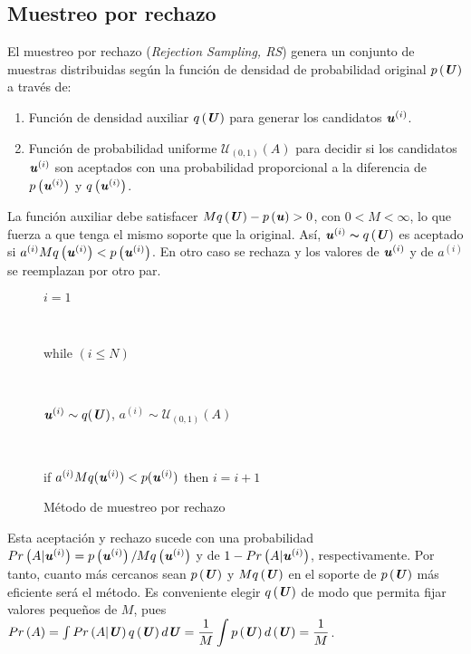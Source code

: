 \subsection{Muestreo por rechazo}
El muestreo por rechazo (\textit{Rejection Sampling, RS}) genera un conjunto de muestras distribuidas según la función de densidad de probabilidad original $p\left(\textbf{\textit{U}}\right)$ a través de:
\begin{enumerate}
    \item Función de densidad auxiliar $q\left(\textbf{\textit{U}}\right)$ para generar los candidatos $\textbf{\textit{u}}^{(i)}$.
    \item Función de probabilidad uniforme $\mathcal{U}_{(0,1)}\left(A\right)$ para decidir si los candidatos $\textbf{\textit{u}}^{(i)}$ son aceptados con una probabilidad proporcional a la diferencia de $p\left(\textbf{\textit{u}}^{(i)}\right)$ y $q\left(\textbf{\textit{u}}^{(i)}\right)$.
\end{enumerate}

La función auxiliar debe satisfacer $Mq\left(\textbf{\textit{U}}\right) - p\left(\textbf{\textit{u}}\right) > 0$, con $0 < M < \infty$, lo que fuerza a que tenga el mismo soporte que la original. Así, $\textbf{\textit{u}}^{(i)} \thicksim q\left(\textbf{\textit{U}}\right)$ es aceptado si $a^{(i)}Mq\left(\textbf{\textit{u}}^{(i)}\right) < p\left(\textbf{\textit{u}}^{(i)}\right)$. En otro caso se rechaza y los valores de $\textbf{\textit{u}}^{(i)}$ y de $a^{(i)}$ se reemplazan por otro par.

\begin{figure}[ht]
    \centering
    \begin{tcolorbox}[colframe=black, colback=white, boxrule=0.5pt, width=0.52\textwidth, sharp corners]
        \parbox[t]{\linewidth}{$i=1$} \\[0.5em]
        \parbox[t]{\linewidth}{while $(i \leq N)$} \\[0.5em]
        \parbox[t]{\linewidth}{\hspace{1em} $\textbf{\textit{u}}^{(i)} \sim q(\textbf{\textit{U}})$, \quad $a^{(i)} \sim \mathcal{U}_{(0,1)}\left(A\right)$} \\[0.5em]
        \parbox[t]{\linewidth}{\hspace{1em} if $a^{(i)}Mq(\textbf{\textit{u}}^{(i)})< p(\textbf{\textit{u}}^{(i)})$ then $i = i + 1$}
    \end{tcolorbox}
    \caption{Método de muestreo por rechazo}
    \label{fig:3.1}
\end{figure}

Esta aceptación y rechazo sucede con una probabilidad $Pr\left(A|\textbf{\textit{u}}^{(i)}\right) = p\left(\textbf{\textit{u}}^{(i)}\right) / Mq\left(\textbf{\textit{u}}^{(i)}\right)$ y de $1-Pr\left(A|\textbf{\textit{u}}^{(i)}\right)$, respectivamente. Por tanto, cuanto más cercanos sean $p\left(\textbf{\textit{U}}\right)$ y $Mq\left(\textbf{\textit{U}}\right)$ en el soporte de $p\left(\textbf{\textit{U}}\right)$ más eficiente será el método. Es conveniente elegir $q\left(\textbf{\textit{U}}\right)$ de modo que permita fijar valores pequeños de $M$, pues $Pr\left(A\right) = \int Pr\left(A|\textbf{\textit{U}}\right)q\left(\textbf{\textit{U}}\right)d\textbf{\textit{U}} = \dfrac{1}{M} \displaystyle \int p\left(\textbf{\textit{U}}\right)d\left(\textbf{\textit{U}}\right) = \frac{1}{M}$.

